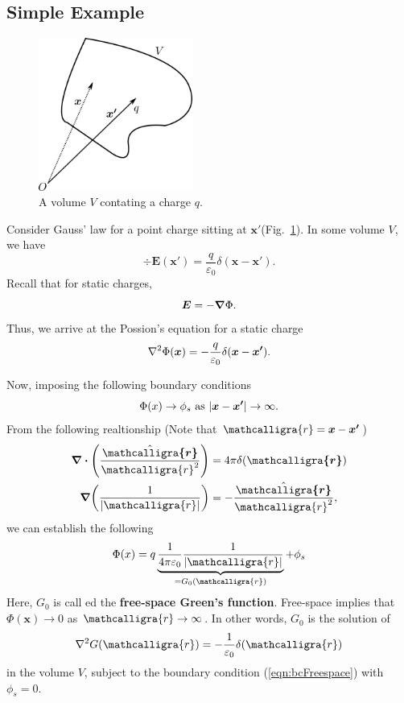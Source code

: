 \documentclass[12pt,english]{article}
\newcommand{\curly}[1]{\ensuremath{\mathcalligra{#1}}}
\let\oldhat\hat
\renewcommand{\vec}[1]{\boldsymbol{#1}}
\renewcommand{\hat}[1]{\oldhat{\boldsymbol{#1}}}
\begin{document}
\subsection{Simple Example}
\begin{figure}[H]
    \centering
    \includegraphics[width = 0.45\textwidth]{chargeinV.png}
    \caption{A volume $V$ contating a charge $q$.}
    \label{fig:chargeinV}
\end{figure}
Consider Gauss' law for a point charge sitting at $\vec{x'}$(Fig.~\ref{fig:chargeinV}). In some volume $V$, we have
\begin{equation*}
    \div \vec{E}(\vec{x'}) = \frac{q}{\varepsilon_0}\delta(\vec{x}-\vec{x'}).
\end{equation*}
Recall that for static charges,
\begin{equation*}
    \vec{E} = -\grad \Phi.
\end{equation*}
Thus, we arrive at the Possion's equation for a static charge
\begin{equation}
    \laplacian\Phi(\vec{x}) = -\frac{q}{\varepsilon_0}\delta(\vec{x} - \vec{x'}).
\end{equation}

Now, imposing the following boundary conditions
\begin{equation}
    \Phi(x) \to \phi_s \text{ as } \abs{\vec{x} - \vec{x'}} \to \infty. \label{eqn:bcFreespace}
\end{equation}
From the following realtionship (Note that $\curly{r} = \vec{x} - \vec{x'}$)
\begin{subequations}
    \begin{align}
        \div\left(\frac{\hat{\curly{r}}}{\curly{r}^2}\right) & = 4\pi\delta(\vec{\curly{r}})           \\
        \grad(\frac{1}{\abs{\curly{r}}})                     & = -\frac{\hat{\curly{r}}}{\curly{r}^2},
    \end{align}
\end{subequations}
we can establish the following
\begin{equation}
    \Phi(x) = q \underbrace{\frac{1}{4\pi\varepsilon_0}\frac{1}{\abs{\curly{r}}}}_{=G_0(\curly{r})} + \phi_s
\end{equation}
Here, $G_0$ is call ed the \textbf{free-space Green's function}. Free-space implies that $\Phi(\vec{x}) \to 0$ as $\curly{r} \to \infty$. In other words, $G_0$ is the solution of 
\begin{equation}
    \laplacian G(\curly{r}) = -\frac{1}{\varepsilon_0} \delta(\curly{r})
\end{equation}
in the volume $V$, subject to the boundary condition (\ref{eqn:bcFreespace}) with $\phi_s = 0$.
\end{document}
